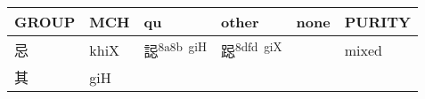 \documentclass[14pt,a4paper]{scrartcl}
\begin{document}
\begin{longtable}[c]{@{}llllll@{}}
\toprule
\begin{minipage}[b]{0.14\columnwidth}\raggedright\strut
GROUP
\strut\end{minipage} &
\begin{minipage}[b]{0.14\columnwidth}\raggedright\strut
MCH
\strut\end{minipage} &
\begin{minipage}[b]{0.14\columnwidth}\raggedright\strut
qu
\strut\end{minipage} &
\begin{minipage}[b]{0.14\columnwidth}\raggedright\strut
other
\strut\end{minipage} &
\begin{minipage}[b]{0.14\columnwidth}\raggedright\strut
none
\strut\end{minipage} &
\begin{minipage}[b]{0.14\columnwidth}\raggedright\strut
PURITY
\strut\end{minipage}\tabularnewline
\midrule
\endhead
\begin{minipage}[t]{0.14\columnwidth}\raggedright\strut
忌
\strut\end{minipage} &
\begin{minipage}[t]{0.14\columnwidth}\raggedright\strut
khiX
\strut\end{minipage} &
\begin{minipage}[t]{0.14\columnwidth}\raggedright\strut
誋\textsuperscript{8a8b~giH}
\strut\end{minipage} &
\begin{minipage}[t]{0.14\columnwidth}\raggedright\strut
跽\textsuperscript{8dfd~giX}
\strut\end{minipage} &
\begin{minipage}[t]{0.14\columnwidth}\raggedright\strut
\strut\end{minipage} &
\begin{minipage}[t]{0.14\columnwidth}\raggedright\strut
mixed
\strut\end{minipage}\tabularnewline
\begin{minipage}[t]{0.14\columnwidth}\raggedright\strut
其
\strut\end{minipage} &
\begin{minipage}[t]{0.14\columnwidth}\raggedright\strut
giH
\strut\end{minipage} &
\begin{minipage}[t]{0.14\columnwidth}\raggedright\strut
\strut\end{minipage} &

\end{longtable}
\end{document}

